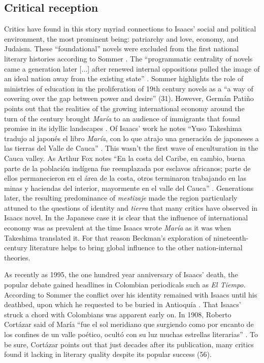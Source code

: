 \documentclass[12pt]{report}
\begin{document}
\subsection{Critical reception}
Critics have found in this story myriad connections to Isaacs' social and political environment, the most prominent being: patriarchy and love, economy,  and Judaism.
These \enquote{foundational} novels were excluded from the first national literary histories according to Sommer \autocite{Sommer1991}. 
The \enquote{programmatic centrality of novels came a generation later [...] after renewed internal oppositions pulled the image of an ideal nation away from the existing state} \autocite[30]{Sommer1991}.
Sommer highlights the role of ministries of education in the proliferation of 19th century novels as a \enquote{a way of covering over the gap between power and desire} (31). 
However, Germán Patiño points out that the realities of the growing international economy around the turn of the century brought \textit{María} to an audience of immigrants that found promise in its idyllic landscapes \nocite{Patino1992}. 
Of Isaacs' work he notes \enquote{Yuso Takeshima tradujo al japonés el libro \textit{María}, con lo que atrajo una generación de japoneses a las tierras del Valle de Cauca} \autocite[37]{Patino1992}.
This wasn't the first wave of enculturation in the Cauca valley.
As Arthur Fox notes \enquote{En la costa del Caribe, en cambio, buena parte de la población indígena fue reemplazada por esclavos africanos; parte de ellos permanecieron en el área de la costa, otros terminaron trabajando en las minas y haciendas del interior, mayormente en el valle del Cauca} \autocite[333]{Fox2011}. 
Generations later, the resulting predominance of \textit{mestizaje} made the region particularly attuned to the questions of identity and \textit{tierra} that many critics have observed in Isaacs novel. 
In the Japanese case it is clear that the influence of international economy was as prevalent at the time Isaacs wrote \textit{María} as it was when Takeshima translated it. 
For that reason Beckman's exploration of nineteenth-century literature helps to bring global influence to the other nation-internal theories.


As recently as 1995, the one hundred year anniversary of Isaacs' death, the popular debate gained headlines in Colombian periodicals such as \textit{El Tiempo.}
According to Sommer  the conflict over his identity remained with Isaacs until his deathbed, upon which he requested to be buried in Antioquía \autocite[268]{Sommer1997}.
That Isaacs' struck a chord with Colombians was apparent early on. In 1908, Roberto Cortázar said of María \enquote{fue el sol meridiano que surgiendo como por encanto de los confines de un valle poético, ocultó con su luz muchas estrellas literarias} \autocite[55]{Cortazar1908}. 
To be sure, Cortázar points out that just decades after its publication, many critics found it lacking in literary quality despite its popular success (56)\nocite{Cortazar1908}.
\end{document}
